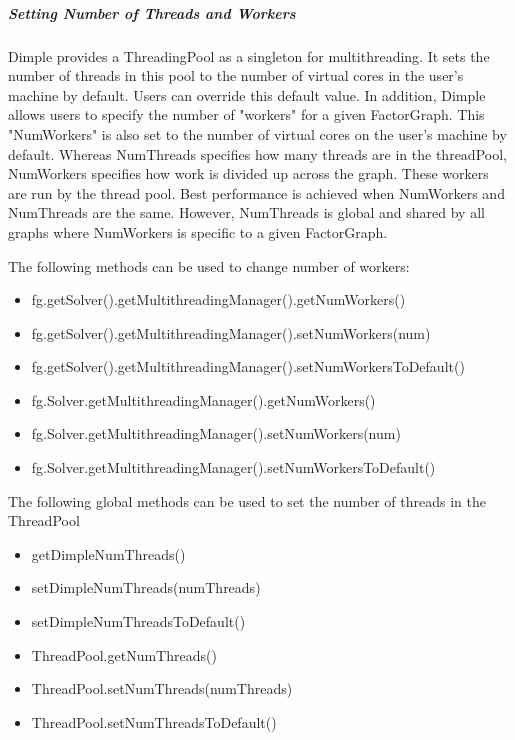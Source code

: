 \subparagraph{Setting Number of Threads and Workers}

Dimple provides a ThreadingPool as a singleton for multithreading.  It sets the number of threads in this pool to the number of virtual cores in the user's machine by default.  Users can override this default value.  In addition, Dimple allows users to specify the number of "workers" for a given FactorGraph.  This "NumWorkers" is also set to the number of virtual cores on the user's machine by default.  Whereas NumThreads specifies how many threads are in the threadPool, NumWorkers specifies how work is divided up across the graph.  These workers are run by the thread pool.  Best performance is achieved when NumWorkers and NumThreads are the same.  However, NumThreads is global and shared by all graphs where NumWorkers is specific to a given FactorGraph.

The following methods can be used to change number of workers:

\ifjava
\begin{itemize}
\item fg.getSolver().getMultithreadingManager().getNumWorkers()
\item fg.getSolver().getMultithreadingManager().setNumWorkers(num)
\item fg.getSolver().getMultithreadingManager().setNumWorkersToDefault()
\end{itemize}
\fi

\ifmatlab
\begin{itemize}
\item fg.Solver.getMultithreadingManager().getNumWorkers()
\item fg.Solver.getMultithreadingManager().setNumWorkers(num)
\item fg.Solver.getMultithreadingManager().setNumWorkersToDefault()
\end{itemize}
\fi

The following global methods can be used to set the number of threads in the ThreadPool

\ifmatlab
\begin{itemize}
\item getDimpleNumThreads()
\item setDimpleNumThreads(numThreads)
\item setDimpleNumThreadsToDefault()
\end{itemize}
\fi

\ifjava
\begin{itemize}
\item ThreadPool.getNumThreads()
\item ThreadPool.setNumThreads(numThreads)
\item ThreadPool.setNumThreadsToDefault()
\end{itemize}
\fi


